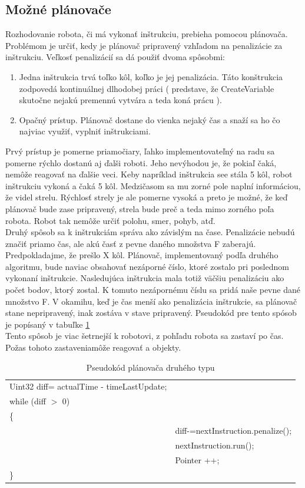 \subsection{Možné plánovače}

Rozhodovanie robota, či má vykonať inštrukciu, prebieha pomocou plánovača. Problémom je určiť, kedy je plánovač pripravený vzhľadom na penalizácie za inštrukciu. Veľkosť penalizácií sa dá použiť dvoma spôsobmi:
\begin{enumerate}
\item Jedna inštrukcia trvá toľko kôl, koľko je jej penalizácia. Táto konštrukcia zodpovedá kontinuálnej dlhodobej práci ( predstave, že CreateVariable skutočne nejakú premennú vytvára a teda koná prácu ).
\item Opačný prístup. Plánovač dostane do vienka nejaký čas a snaží sa ho čo najviac využiť, vyplniť inštrukciami.
\end{enumerate}
Prvý prístup je pomerne priamočiary, ľahko implementovateľný  na radu sa pomerne rýchlo dostanú aj ďalši roboti. Jeho nevýhodou je, že pokiaľ čaká, nemôže reagovať na ďalšie veci. Keby napríklad inštrukcia see stála 5 kôl, robot inštrukciu vykoná a čaká 5 kôl. Medzičasom sa mu zorné pole naplní informáciou, že videl strelu.  Rýchlosť strely je ale pomerne vysoká a preto je možné, že keď plánovač bude zase pripravený, strela bude preč a teda mimo zorného poľa robota. Robot tak nemôže určiť polohu, smer, pohyb, atď.\\
Druhý spôsob sa k inštrukciám správa ako závislým na čase. Penalizácie nebudú značiť priamo čas, ale akú časť z pevne daného množstva F zaberajú. Predpokladajme, že prešlo X kôl. Plánovač, implementovaný podľa druhého algoritmu, bude naviac obsahovať nezáporné číslo, ktoré zostalo pri poslednom vykonaní inštrukcie. Nasledujúca inštrukcia mala totiž väčšiu penalizáciu ako počet bodov, ktorý zostal. K tomuto nezápornému číslu sa pridá naše pevne dané množstvo F. V okamihu, keď je čas menší ako penalizácia inštrukcie, sa plánovač stane nepripravený, inak zostáva v stave pripravený. Pseudokód pre tento spósob je popísaný v tabuľke \ref{tab:sched2}\\
Tento spôsob je viac šetrnejší k robotovi, z pohľadu robota sa zastaví po čas. Požas tohoto zastaveniamôže reagovať a objekty.\\
\begin {table}
\centering
\begin{tabular}{|ll|}
\hline
Uint32 diff= actualTime - timeLastUpdate; &\\
while (diff $>$ 0)&\\
\{& \\ 
&diff-=nextInstruction.penalize();\\
&nextInstruction.run();\\
&Pointer ++; \\
\}&\\ 
\hline
\end{tabular}
\caption{Pseudokód plánovača druhého typu}
\label{tab:sched2}
\end{table}

